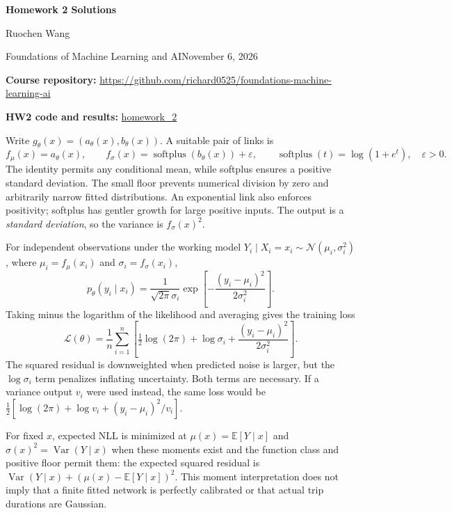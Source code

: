 \documentclass[10pt,letterpaper]{article}
\newcommand{\heading}[1]{\vspace{4pt}{\large\bfseries #1}\par}
\newcommand{\parthead}[1]{\vspace{3pt}{\bfseries #1}\par}
\begin{document}
\thispagestyle{empty}
{\LARGE\bfseries Homework 2 Solutions}\par
{\large Ruochen Wang}\par
Foundations of Machine Learning and AI\hfill November 6, 2026

\textbf{Course repository:} \url{https://github.com/richard0525/foundations-machine-learning-ai}

\textbf{HW2 code and results:} \href{https://github.com/richard0525/foundations-machine-learning-ai/tree/main/homework_2}{homework\_2}

\heading{1. Conditional mean and uncertainty}
\parthead{(a) Links for the two network outputs}
Write $g_\theta(x)=(a_\theta(x),b_\theta(x))$. A suitable pair of links is
\[
  f_\mu(x)=a_\theta(x),\qquad
  f_\sigma(x)=\operatorname{softplus}(b_\theta(x))+\varepsilon,
  \qquad \operatorname{softplus}(t)=\log(1+e^t),\quad\varepsilon>0.
\]
The identity permits any conditional mean, while softplus ensures a positive standard deviation. The small floor prevents numerical division by zero and arbitrarily narrow fitted distributions. An exponential link also enforces positivity; softplus has gentler growth for large positive inputs. The output is a \emph{standard deviation}, so the variance is $f_\sigma(x)^2$.

\parthead{(b) Gaussian negative log-likelihood}
For independent observations under the working model
$Y_i\mid X_i=x_i\sim\mathcal N(\mu_i,\sigma_i^2)$, where $\mu_i=f_\mu(x_i)$ and $\sigma_i=f_\sigma(x_i)$,
\[
 p_\theta(y_i\mid x_i)=\frac{1}{\sqrt{2\pi}\sigma_i}
 \exp\!\left[-\frac{(y_i-\mu_i)^2}{2\sigma_i^2}\right].
\]
Taking minus the logarithm of the likelihood and averaging gives the training loss
\[
 \boxed{\mathcal L(\theta)=\frac1n\sum_{i=1}^n
 \left[\tfrac12\log(2\pi)+\log\sigma_i+
       \frac{(y_i-\mu_i)^2}{2\sigma_i^2}\right].}
\]
The squared residual is downweighted when predicted noise is larger, but the $\log\sigma_i$ term penalizes inflating uncertainty. Both terms are necessary. If a variance output $v_i$ were used instead, the same loss would be
$\tfrac12[\log(2\pi)+\log v_i+(y_i-\mu_i)^2/v_i]$.

For fixed $x$, expected NLL is minimized at $\mu(x)=\mathbb E[Y\mid x]$ and $\sigma(x)^2=\operatorname{Var}(Y\mid x)$ when these moments exist and the function class and positive floor permit them: the expected squared residual is $\operatorname{Var}(Y\mid x)+(\mu(x)-\mathbb E[Y\mid x])^2$. This moment interpretation does not imply that a finite fitted network is perfectly calibrated or that actual trip durations are Gaussian.
\end{document}
